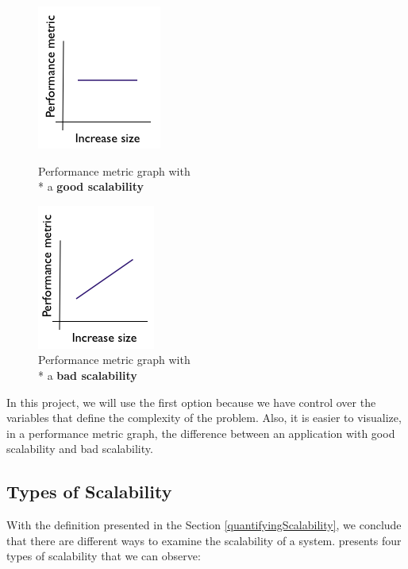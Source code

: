 \begin{figure}[ht]
\begin{minipage}[b]{0.5\linewidth}
\centering
\includegraphics[scale=0.7]{images/scalabilitygood}
\caption{Performance metric graph with \\* a \textbf{good scalability}}
\label{fig:goodscalability}
\end{minipage}
\hspace{0.5cm}
\begin{minipage}[b]{0.5\linewidth}
\centering
\includegraphics[scale=0.7]{images/scalabilitybad}
\caption{Performance metric graph with \\* a \textbf{bad scalability}}
\label{fig:badscalability}
\end{minipage}
\end{figure}


In this project, we will use the first option because we have control over the variables that define the complexity of the problem. Also, it is easier to visualize, in a performance metric graph, the difference between an application with good scalability and bad scalability.

\subsection{Types of Scalability}
With the definition presented in the Section \ref{quantifyingScalability}, we conclude that there are different ways to examine the scalability of a system. \cite{BONDI} presents four types of scalability that we can observe:


